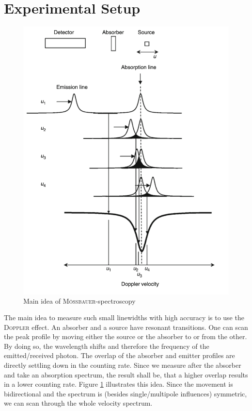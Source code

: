\documentclass[11pt,a4paper,notitlepage]{scrartcl}
\begin{document}
\section{Experimental Setup}
\begin{figure}
	\centering
	\includegraphics[width=\linewidth]{figs/source.png}
	\caption{Main idea of \textsc{Mö\ss bauer}-spectroscopy \cite{chemistry}}\label{fig:source}
\end{figure}  
The main idea to measure such small linewidths with high accuracy is to use the \textsc{Doppler} effect. An absorber and a source have resonant transitions. One can scan the peak profile by moving either the source or the absorber to or from the other. By doing so, the wavelength shifts and therefore the frequency of the emitted/received photon. The overlap of the absorber and emitter profiles are directly settling down in the counting rate. Since we measure after the absorber and take an absorption spectrum, the result shall be, that a higher overlap results in a lower counting rate. Figure \ref{fig:source} illustrates this idea. Since the movement is bidirectional and the spectrum is (besides single/multipole influences) symmetric, we can scan through the whole velocity spectrum. \cite{chemistry}
\end{document}
